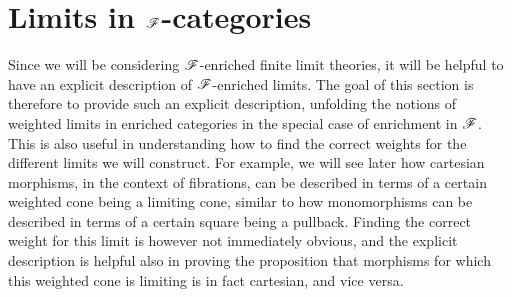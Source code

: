 \documentclass[../thesis.tex]{subfiles}
\begin{document}
\section{Limits in \texorpdfstring{${\mathscr{F}}$}{F}-categories}
Since we will be considering ${\mathscr{F}}$-enriched finite limit theories, it will be helpful to have an
explicit description of ${\mathscr{F}}$-enriched limits. The goal of this section is therefore to provide
such an explicit description, unfolding the notions of weighted limits in enriched categories in
the special case of enrichment in ${\mathscr{F}}$. This is also useful in understanding how to find the
correct weights for the different limits we will construct. For example, we will see later how
cartesian morphisms, in the context of fibrations, can be described in terms of a certain weighted
cone being a limiting cone, similar to how monomorphisms can be described in terms of a certain
square being a pullback. Finding the correct weight for this limit is however not immediately
obvious, and the explicit description is helpful also in proving the proposition that morphisms
for which this weighted cone is limiting is in fact cartesian, and vice versa.
\end{document}

